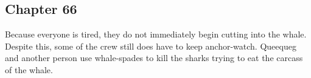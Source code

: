 \subsection{Chapter 66}

Because everyone is tired, they do not immediately begin cutting into the
whale. Despite this, some of the crew still does have to keep anchor-watch.
Queequeg and another person use whale-spades to kill the sharks trying to eat
the carcass of the whale.

